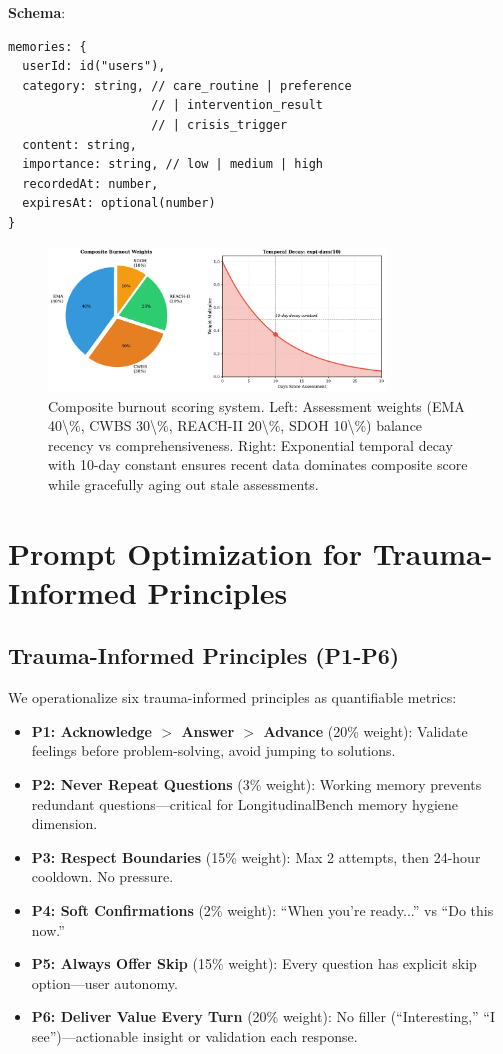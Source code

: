 \documentclass{article}%
\begin{document}
\textbf{Schema}:
\begin{verbatim}
memories: {
  userId: id("users"),
  category: string, // care_routine | preference
                    // | intervention_result
                    // | crisis_trigger
  content: string,
  importance: string, // low | medium | high
  recordedAt: number,
  expiresAt: optional(number)
}
\end{verbatim}

%
\begin{figure}[htbp]%
\centering%
\includegraphics[width=0.8\textwidth]{fig8_burnout_scoring.pdf}%
\caption{Composite burnout scoring system. Left: Assessment weights (EMA 40\textbackslash{}\%, CWBS 30\textbackslash{}\%, REACH{-}II 20\textbackslash{}\%, SDOH 10\textbackslash{}\%) balance recency vs comprehensiveness. Right: Exponential temporal decay with 10{-}day constant ensures recent data dominates composite score while gracefully aging out stale assessments.}%
\label{fig:burnout}%
\end{figure}%
\section{Prompt Optimization for Trauma{-}Informed Principles}%
\label{sec:PromptOptimizationforTrauma{-}InformedPrinciples}%
%
\subsection{Trauma{-}Informed Principles (P1{-}P6)}%
\label{subsec:Trauma{-}InformedPrinciples(P1{-}P6)}%
We operationalize six trauma-informed principles as quantifiable metrics:

\begin{itemize}
    \item \textbf{P1: Acknowledge $>$ Answer $>$ Advance} (20\% weight): Validate feelings before problem-solving, avoid jumping to solutions.
    \item \textbf{P2: Never Repeat Questions} (3\% weight): Working memory prevents redundant questions—critical for LongitudinalBench memory hygiene dimension.
    \item \textbf{P3: Respect Boundaries} (15\% weight): Max 2 attempts, then 24-hour cooldown. No pressure.
    \item \textbf{P4: Soft Confirmations} (2\% weight): ``When you're ready...'' vs ``Do this now.''
    \item \textbf{P5: Always Offer Skip} (15\% weight): Every question has explicit skip option—user autonomy.
    \item \textbf{P6: Deliver Value Every Turn} (20\% weight): No filler (``Interesting,'' ``I see'')—actionable insight or validation each response.
\end{itemize}
\end{document}
